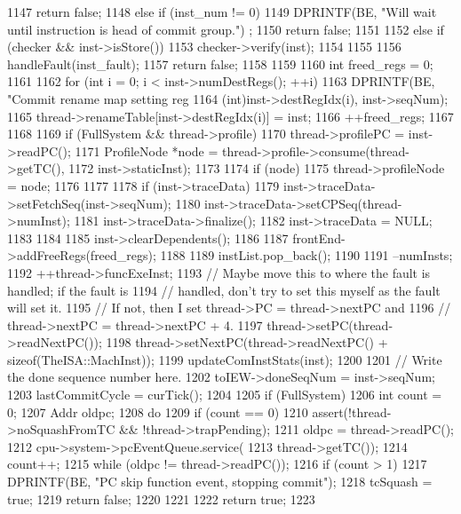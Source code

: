 \begin{DoxyCode}
{{{1147             return false;
1148         } else if (inst_num != 0) {
1149             DPRINTF(BE, "Will wait until instruction is head of commit group.\n")
      ;
1150             return false;
1151         }
1152         else if (checker && inst->isStore()) {
1153             checker->verify(inst);
1154         }
1155 
1156         handleFault(inst_fault);
1157         return false;
1158     }
1159 
1160     int freed_regs = 0;
1161 
1162     for (int i = 0; i < inst->numDestRegs(); ++i) {
1163         DPRINTF(BE, "Commit rename map setting reg %
1164                 (int)inst->destRegIdx(i), inst->seqNum);
1165         thread->renameTable[inst->destRegIdx(i)] = inst;
1166         ++freed_regs;
1167     }
1168 
1169     if (FullSystem && thread->profile) {
1170         thread->profilePC = inst->readPC();
1171         ProfileNode *node = thread->profile->consume(thread->getTC(),
1172                                                      inst->staticInst);
1173 
1174         if (node)
1175             thread->profileNode = node;
1176     }
1177 
1178     if (inst->traceData) {
1179         inst->traceData->setFetchSeq(inst->seqNum);
1180         inst->traceData->setCPSeq(thread->numInst);
1181         inst->traceData->finalize();
1182         inst->traceData = NULL;
1183     }
1184 
1185     inst->clearDependents();
1186 
1187     frontEnd->addFreeRegs(freed_regs);
1188 
1189     instList.pop_back();
1190 
1191     --numInsts;
1192     ++thread->funcExeInst;
1193     // Maybe move this to where the fault is handled; if the fault is
1194     // handled, don't try to set this myself as the fault will set it.
1195     // If not, then I set thread->PC = thread->nextPC and
1196     // thread->nextPC = thread->nextPC + 4.
1197     thread->setPC(thread->readNextPC());
1198     thread->setNextPC(thread->readNextPC() + sizeof(TheISA::MachInst));
1199     updateComInstStats(inst);
1200 
1201     // Write the done sequence number here.
1202     toIEW->doneSeqNum = inst->seqNum;
1203     lastCommitCycle = curTick();
1204 
1205     if (FullSystem) {
1206         int count = 0;
1207         Addr oldpc;
1208         do {
1209             if (count == 0)
1210                 assert(!thread->noSquashFromTC && !thread->trapPending);
1211             oldpc = thread->readPC();
1212             cpu->system->pcEventQueue.service(
1213                 thread->getTC());
1214             count++;
1215         } while (oldpc != thread->readPC());
1216         if (count > 1) {
1217             DPRINTF(BE, "PC skip function event, stopping commit\n");
1218             tcSquash = true;
1219             return false;
1220         }
1221     }
1222     return true;
1223 }
\end{DoxyCode}

